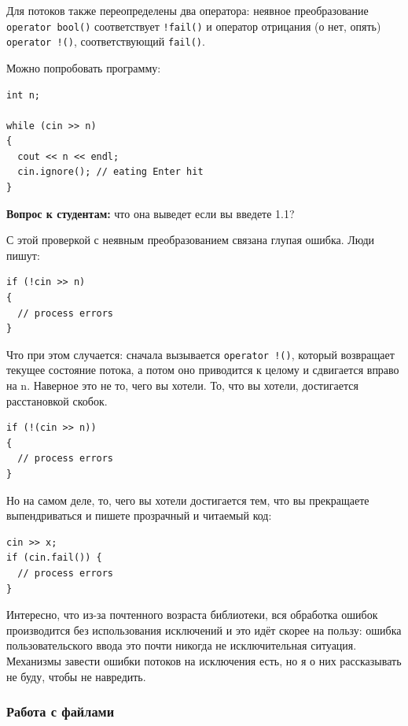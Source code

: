 \documentclass[a4paper,12pt,oneside]{article}
\newif\ifanswers
\begin{document}
Для потоков также переопределены два оператора: неявное преобразование \lstinline!operator bool()! соответствует \lstinline?!fail()? и оператор отрицания (о нет, опять) \lstinline?operator !()?, соответствующий \lstinline?fail()?.

Можно попробовать программу:

\begin{lstlisting}
int n;

while (cin >> n)
{
  cout << n << endl;
  cin.ignore(); // eating Enter hit
}
\end{lstlisting}

\textbf{Вопрос к студентам:} что она выведет если вы введете 1.1?

\ifanswers
Правильный ответ: она выведет
\begin{verbatim}
1 
1
\end{verbatim}
так как точка будет съедена в ignore.
\fi

С этой проверкой с неявным преобразованием связана глупая ошибка. Люди пишут:

\begin{lstlisting}
if (!cin >> n)
{
  // process errors
}
\end{lstlisting}

Что при этом случается: сначала вызывается \lstinline?operator !()?, который возвращает текущее состояние потока, а потом оно приводится к целому и сдвигается вправо на n. Наверное это не то, чего вы хотели. То, что вы хотели, достигается расстановкой скобок.

\begin{lstlisting}
if (!(cin >> n))
{
  // process errors
}
\end{lstlisting}

Но на самом деле, то, чего вы хотели достигается тем, что вы прекращаете выпендриваться и пишете прозрачный и читаемый код:

\begin{lstlisting}
cin >> x;
if (cin.fail()) {
  // process errors
}
\end{lstlisting}

Интересно, что из-за почтенного возраста библиотеки, вся обработка ошибок производится без использования исключений и это идёт скорее на пользу: ошибка пользовательского ввода это почти никогда не исключительная ситуация. Механизмы завести ошибки потоков на исключения есть, но я о них рассказывать не буду, чтобы не навредить.

\subsubsection{Работа с файлами}
\end{document}
